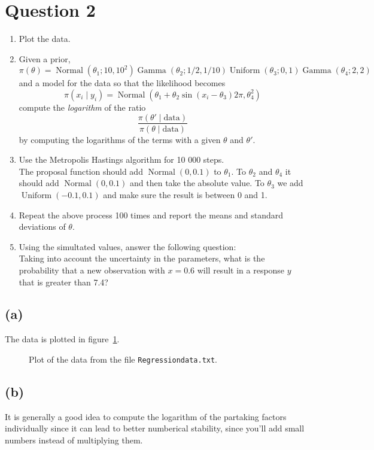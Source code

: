 \documentclass{article}
\DeclareMathOperator\GammaDist{Gamma}
\DeclareMathOperator\Normal{Normal}
\DeclareMathOperator\Uniform{Uniform}
\begin{document}
\section{Question 2}
\begin{enumerate}[label=(\alph*)]
\item Plot the data.
\item Given a prior, $$\pi(\theta) = \Normal (\theta_1; 10, 10^2) \GammaDist (\theta_2; 1/2, 1/10) \Uniform (\theta_3; 0, 1) \GammaDist (\theta_4; 2, 2)$$
and a model for the data so that the likelihood becomes $$\pi (x_i \mid y_i) = \Normal(\theta_1 + \theta_2 \sin(x_i - \theta_3) 2\pi, \theta_4^2)$$
compute the \textit{logarithm} of the ratio $$\frac{\pi(\theta' \mid \text{data})}{\pi(\theta \mid \text{data})}$$
by computing the logarithms of the terms with a given $\theta$ and $\theta'$.
\item Use the Metropolis Hastings algorithm for 10 000 steps. \\
The proposal function should add $\Normal(0, 0.1)$ to $\theta_1$.
To $\theta_2$ and $\theta_4$ it should add $\Normal (0, 0.1)$ and then take the absolute value.
To $\theta_3$ we add $\Uniform(-0.1, 0.1)$ and make sure the result is between 0 and 1.
\item Repeat the above process 100 times and report the means and standard deviations of $\theta$.
\item Using the simultated values, answer the following question: \\
Taking into account the uncertainty in the parameters, what is the probability that a new observation with $x = 0.6$ will result in a response $y$ that is greater than 7.4?
\end{enumerate}

\subsection{(a)}
The data is plotted in figure~\ref{fig:data_plot}.

\begin{figure}
	\centering
	
	\caption{Plot of the data from the file \texttt{Regressiondata.txt}. \label{fig:data_plot}}
\end{figure}

\subsection{(b)}
It is generally a good idea to
compute the logarithm of the partaking factors individually
since it can lead to better numberical stability,
since you'll add small numbers instead of multiplying them.
\end{document}
